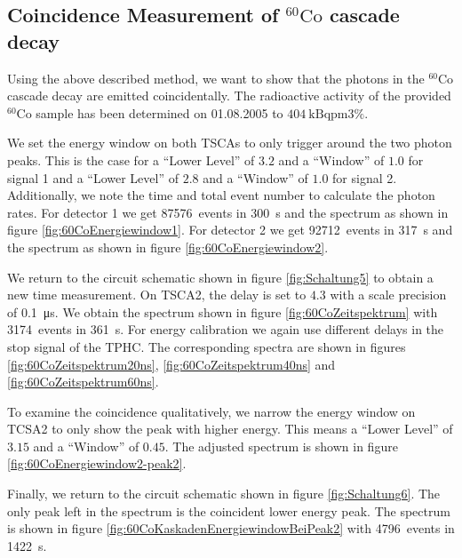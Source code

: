 \subsection*{Coincidence Measurement of $^{60}\text{Co}$ cascade decay}
%
Using the above described method, we want to show that the photons in the $^{60}\text{Co}$ cascade decay are emitted coincidentally.
The radioactive activity of the provided $^{60}\text{Co}$ sample has been determined on 01.08.2005 to $\SI{404}{\kilo\becquerel \pm 3 \percent}$.
%
\par
%
We set the energy window on both TSCAs to only trigger around the two photon peaks.
This is the case for a \enquote{Lower Level} of $3.2$ and a \enquote{Window} of $1.0$ for signal 1 and a \enquote{Lower Level} of $2.8$ and a \enquote{Window} of $1.0$ for signal 2.
Additionally, we note the time and total event number to calculate the photon rates.
For detector 1 we get \SI{87576}{events} in \SI{300}{\second} and the spectrum as shown in figure \ref{fig:60CoEnergiewindow1}.
For detector 2 we get \SI{92712}{events} in \SI{317}{\second} and the spectrum as shown in figure \ref{fig:60CoEnergiewindow2}.
%
\par
%
We return to the circuit schematic shown in figure \ref{fig:Schaltung5} to obtain a new time measurement.
On TSCA2, the delay is set to $4.3$ with a scale precision of \SI{0.1}{\micro\second}.
We obtain the spectrum shown in figure \ref{fig:60CoZeitspektrum} with \SI{3174}{events} in \SI{361}{\second}.
For energy calibration we again use different delays in the stop signal of the TPHC.
The corresponding spectra are shown in figures \ref{fig:60CoZeitspektrum20ns}, \ref{fig:60CoZeitspektrum40ns} and \ref{fig:60CoZeitspektrum60ns}.
%
\par
%
To examine the coincidence qualitatively, we narrow the energy window on TCSA2 to only show the peak with higher energy.
This means a \enquote{Lower Level} of $3.15$ and a \enquote{Window} of $0.45$.
The adjusted spectrum is shown in figure \ref{fig:60CoEnergiewindow2-peak2}.
%
\par
%
Finally, we return to the circuit schematic shown in figure \ref{fig:Schaltung6}.
The only peak left in the spectrum is the coincident lower energy peak.
The spectrum is shown in figure \ref{fig:60CoKaskadenEnergiewindowBeiPeak2} with \SI{4796}{events} in \SI{1422}{\second}.
%
